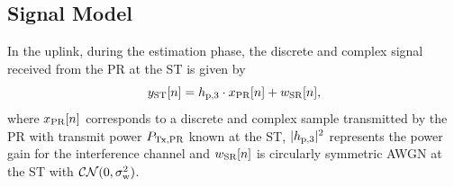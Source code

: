 
\subsection{Signal Model}
In the uplink, during the estimation phase, the discrete and complex signal received from the PR at the ST is given by
\begin{equation}
y_{\text{ST}}[n] = h_{\text{p,3}} \cdot x_{\text{PR}}[n] + w_{\text{SR}}[n],
\label{eq_US:sys_mod_st}
\end{equation}
where $x_{\text{PR}}[n]$ corresponds to a discrete and complex sample transmitted by the PR with transmit power $P_{\text{Tx,PR}}$ known at the ST, $|h_{\text{p,3}}|^2$ represents the power gain for the interference channel and $w_{\text{SR}}[n]$ is circularly symmetric AWGN at the ST with %
$\mathcal{CN}(0, \sigma^2_{\text{w}})$. %

